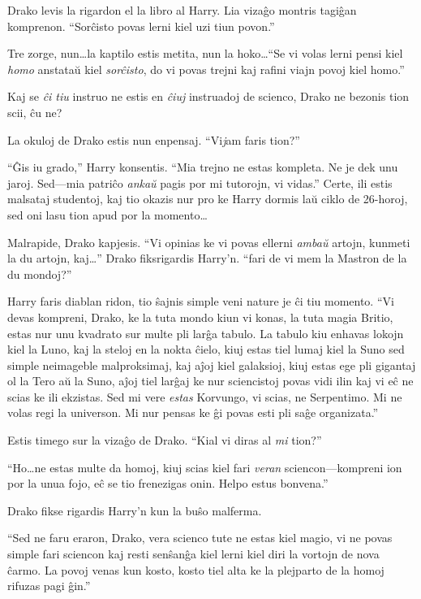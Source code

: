 Drako levis la rigardon el la libro al Harry. Lia vizaĝo montris
tagiĝan komprenon. ``Sorĉisto povas lerni kiel uzi tiun povon.''

Tre zorge, nun\ldots la kaptilo estis metita, nun la hoko\ldots ``Se vi
volas lerni pensi kiel \emph{homo} anstataŭ kiel \emph{sorĉisto}, do
vi povas trejni kaj rafini viajn povoj kiel homo.''

Kaj se \emph{ĉi tiu} instruo ne estis en \emph{ĉiuj} instruadoj de
scienco, Drako ne bezonis tion scii, ĉu ne?

La okuloj de Drako estis nun enpensaj. ``Vi\emph jam faris tion?''

``Ĝis iu grado,'' Harry konsentis. ``Mia trejno ne estas kompleta. Ne
je dek unu jaroj. Sed—mia patriĉo \emph{ankaŭ} pagis por mi tutorojn,
vi vidas.'' Certe, ili estis malsataj studentoj, kaj tio okazis nur
pro ke Harry dormis laŭ ciklo de 26-horoj, sed oni lasu tion apud por
la momento\ldots

Malrapide, Drako kapjesis. ``Vi opinias ke vi povas ellerni
\emph{ambaŭ} artojn, kunmeti la du artojn, kaj\ldots'' Drako
fiksrigardis Harry'n. ``fari de vi mem la Mastron de la du mondoj?''

Harry faris diablan ridon, tio ŝajnis simple veni nature je ĉi tiu
momento. ``Vi devas kompreni, Drako, ke la tuta mondo kiun vi konas,
la tuta magia Britio, estas nur unu kvadrato sur multe pli larĝa
tabulo. La tabulo kiu enhavas lokojn kiel la Luno, kaj la steloj en la
nokta ĉielo, kiuj estas tiel lumaj kiel la Suno sed simple neimageble
malproksimaj, kaj aĵoj kiel galaksioj, kiuj estas ege pli gigantaj ol
la Tero aŭ la Suno, aĵoj tiel larĝaj ke nur sciencistoj povas vidi
ilin kaj vi eĉ ne scias ke ili ekzistas. Sed mi vere \emph{estas}
Korvungo, vi scias, ne Serpentimo. Mi ne volas regi la universon. Mi
nur pensas ke ĝi povas esti pli saĝe organizata.''

Estis timego sur la vizaĝo de Drako. ``Kial vi diras al \emph{mi} tion?''

``Ho\ldots ne estas multe da homoj, kiuj scias kiel fari \emph{veran}
sciencon—kompreni ion por la unua fojo, eĉ se tio frenezigas onin. Helpo
estus bonvena.''

Drako fikse rigardis Harry'n kun la buŝo malferma.

``Sed ne faru eraron, Drako, vera scienco tute ne estas kiel magio, vi
ne povas simple fari sciencon kaj resti senŝanĝa kiel lerni kiel diri la
vortojn de nova ĉarmo. La povoj venas kun kosto, kosto tiel alta ke la
plejparto de la homoj rifuzas pagi ĝin.''

